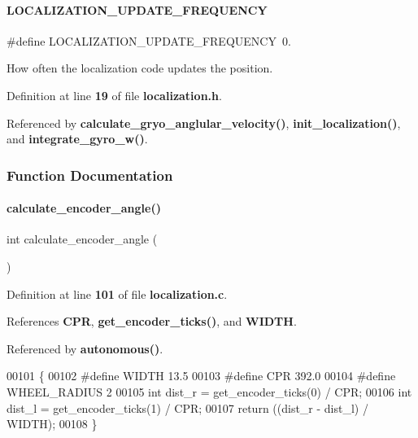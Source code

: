 \paragraph{L\+O\+C\+A\+L\+I\+Z\+A\+T\+I\+O\+N\+\_\+\+U\+P\+D\+A\+T\+E\+\_\+\+F\+R\+E\+Q\+U\+E\+N\+CY}
{\footnotesize\ttfamily \#define L\+O\+C\+A\+L\+I\+Z\+A\+T\+I\+O\+N\+\_\+\+U\+P\+D\+A\+T\+E\+\_\+\+F\+R\+E\+Q\+U\+E\+N\+CY~0.}



How often the localization code updates the position. 



Definition at line \textbf{ 19} of file \textbf{ localization.\+h}.



Referenced by \textbf{ calculate\+\_\+gryo\+\_\+anglular\+\_\+velocity()}, \textbf{ init\+\_\+localization()}, and \textbf{ integrate\+\_\+gyro\+\_\+w()}.



\subsubsection{Function Documentation}
\mbox{\label{a00032_a5dd17937f5561711cd12cdefa8d31869}} 
\paragraph{calculate\+\_\+encoder\+\_\+angle()}
{\footnotesize\ttfamily int calculate\+\_\+encoder\+\_\+angle (\begin{DoxyParamCaption}{ }\end{DoxyParamCaption})}



Definition at line \textbf{ 101} of file \textbf{ localization.\+c}.



References \textbf{ C\+PR}, \textbf{ get\+\_\+encoder\+\_\+ticks()}, and \textbf{ W\+I\+D\+TH}.



Referenced by \textbf{ autonomous()}.


\begin{DoxyCode}
00101                               \{
00102 \textcolor{preprocessor}{#define WIDTH 13.5}
00103 \textcolor{preprocessor}{#define CPR 392.0}
00104 \textcolor{preprocessor}{#define WHEEL\_RADIUS 2}
00105   \textcolor{keywordtype}{int} dist\_r = get_encoder_ticks(0) / CPR;
00106   \textcolor{keywordtype}{int} dist\_l = get_encoder_ticks(1) / CPR;
00107   \textcolor{keywordflow}{return} ((dist\_r - dist\_l) / WIDTH);
00108 \}
\end{DoxyCode}
\mbox{\label{a00032_aadbff35bb757f60bc348d4d778f57a2f}} 
